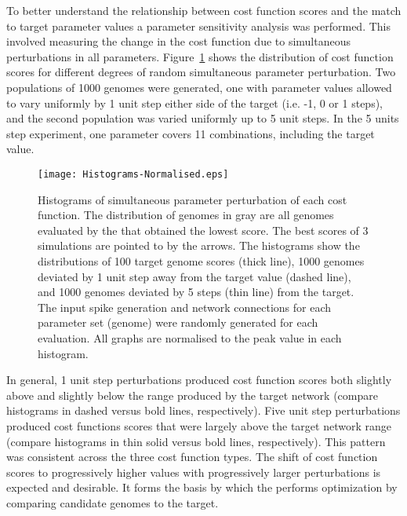 To better understand the relationship between cost function scores and the match
to target parameter values a parameter sensitivity analysis was performed. This
involved measuring the change in the cost function due to simultaneous
perturbations in all parameters.  Figure~\ref{fig:GA:R3} shows the distribution of
cost function scores for different degrees of random simultaneous parameter
perturbation. Two populations of 1000 genomes were generated, one with parameter
values allowed to vary uniformly by 1 unit step either side of the target
(i.e. -1, 0 or 1 steps), and the second population was varied uniformly up to 5
unit steps.  In the 5 units step experiment, one parameter covers 11
combinations, including the target value.


\begin{figure}[th!]
  \centering
  \texttt{[image: Histograms-Normalised.eps]}  
  \caption{Histograms of simultaneous parameter perturbation of each cost
    function. The distribution of genomes in gray are all genomes evaluated by
    the {\GA} that obtained the lowest score. The best scores of 3 {\GA} simulations
    are pointed to by the arrows. The histograms show the distributions of 100
    target genome scores (thick line), 1000 genomes deviated by 1 unit step away
    from the target value (dashed line), and 1000 genomes deviated by 5 steps
    (thin line) from the target. The input spike generation and network
    connections for each parameter set (genome) were randomly generated for each
    evaluation.  All graphs are normalised to the peak value in each
    histogram.}\label{fig:GA:R3}
\end{figure}


\smallskip{}

In general, 1 unit step perturbations produced cost function scores both
slightly above and slightly below the range produced by the target network
(compare histograms in dashed versus bold lines, respectively). Five unit
step perturbations produced cost functions scores that were largely above
the target network range (compare histograms in thin solid versus bold
lines, respectively). This pattern was consistent across the three cost
function types. The shift of cost function scores to progressively higher
values with progressively larger perturbations is expected and
desirable. It forms the basis by which the {\GA} performs optimization by
comparing candidate genomes to the target.

